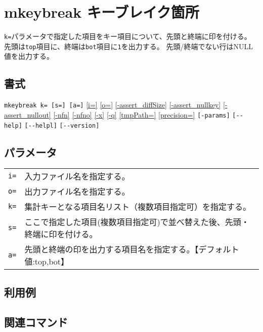 
%

\section{mkeybreak キーブレイク箇所\label{sect:mkeybreak}}
\verb|k=|パラメータで指定した項目をキー項目について、先頭と終端に印を付ける。
先頭は\verb|top|項目に、終端は\verb|bot|項目に\verb|1|を出力する。
先頭/終端でない行はNULL値を出力する。

\subsection*{書式}
\verb|mkeybreak k= [s=] [a=]|
\hyperref[sect:option_i]{[i=]}
\hyperref[sect:option_o]{[o=]}
\hyperref[sect:option_assert_diffSize]{[-assert\_diffSize]}
\hyperref[sect:option_assert_nullkey]{[-assert\_nullkey]}
\hyperref[sect:option_assert_nullout]{[-assert\_nullout]}
\hyperref[sect:option_nfn]{[-nfn]} 
\hyperref[sect:option_nfno]{[-nfno]}  
\hyperref[sect:option_x]{[-x]}
\hyperref[sect:option_q]{[-q]}
\hyperref[sect:option_option_tmppath]{[tmpPath=]}
\hyperref[sect:option_precision]{[precision=]}
\verb|[-params]|
\verb|[--help]|
\verb|[--helpl]|
\verb|[--version]|\\

\subsection*{パラメータ}
\begin{table}[htbp]
{\small
\begin{tabular}{ll}
\verb|i=|    & 入力ファイル名を指定する。\\
\verb|o=|    & 出力ファイル名を指定する。\\
\verb|k=|    & 集計キーとなる項目名リスト（複数項目指定可）を指定する。\\
\verb|s=|    & ここで指定した項目(複数項目指定可)で並べ替えた後、先頭・終端に印を付ける。\\
\verb|a=|    & 先頭と終端の印を出力する項目名を指定する。【デフォルト値:top,bot】\\
\end{tabular} 
}
\end{table} 

\subsection*{利用例}


\subsection*{関連コマンド}

%
